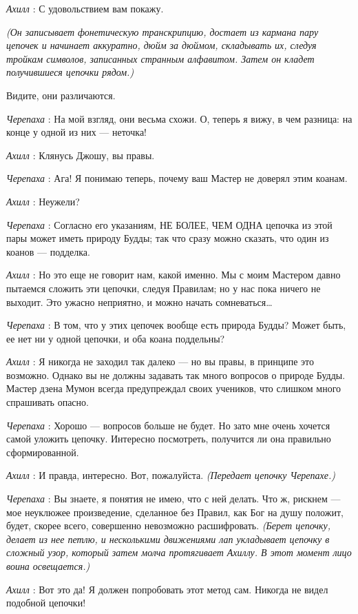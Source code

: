 \emph{Ахилл} : С удовольствием вам покажу.

\emph{(Он записывает фонетическую транскрипцию, достает из кармана пару цепочек и начинает аккуратно, дюйм за дюймом, складывать их, следуя тройкам символов, записанных странным алфавитом. Затем он кладет получившиеся цепочки рядом.)}

Видите, они различаются.

\emph{Черепаха} : На мой взгляд, они весьма схожи. О, теперь я вижу, в чем разница: на конце у одной из них --- неточка!

\emph{Ахилл} : Клянусь Джошу, вы правы.

\emph{Черепаха} : Ага! Я понимаю теперь, почему ваш Мастер не доверял этим коанам.

\emph{Ахилл} : Неужели?

\emph{Черепаха} : Согласно его указаниям, НЕ БОЛЕЕ, ЧЕМ ОДНА цепочка из этой пары может иметь природу Будды; так что сразу можно сказать, что один из коанов --- подделка.

\emph{Ахилл} : Но это еще не говорит нам, какой именно. Мы с моим Мастером давно пытаемся сложить эти цепочки, следуя Правилам; но у нас пока ничего не выходит. Это ужасно неприятно, и можно начать сомневаться\ldots{}

\emph{Черепаха} : В том, что у этих цепочек вообще есть природа Будды? Может быть, ее нет ни у одной цепочки, и оба коана поддельны?

\emph{Ахилл} : Я никогда не заходил так далеко --- но вы правы, в принципе это возможно. Однако вы не должны задавать так много вопросов о природе Будды. Мастер дзена Мумон всегда предупреждал своих учеников, что слишком много спрашивать опасно.

\emph{Черепаха} : Хорошо --- вопросов больше не будет. Но зато мне очень хочется самой уложить цепочку. Интересно посмотреть, получится ли она правильно сформированной.

\emph{Ахилл} : И правда, интересно. Вот, пожалуйста. \emph{(Передает цепочку Черепахе.)}

\emph{Черепаха} : Вы знаете, я понятия не имею, что с ней делать. Что ж, рискнем --- мое неуклюжее произведение, сделанное без Правил, как Бог на душу положит, будет, скорее всего, совершенно невозможно расшифровать. \emph{(Берет цепочку, делает из нее петлю, и несколькими движениями лап укладывает цепочку в сложный узор, который затем молча протягивает Ахиллу. В этот момент лицо воина освещается.)}

\emph{Ахилл} : Вот это да! Я должен попробовать этот метод сам. Никогда не видел подобной цепочки!

